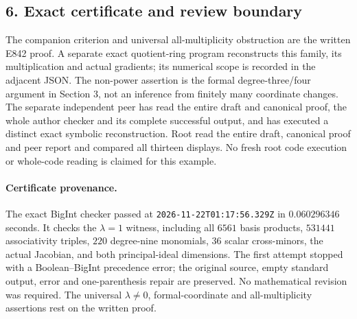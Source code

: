 \subsection{6. Exact certificate and review boundary}\label{SF-E844:exact-certificate-and-review-boundary}

The companion criterion and universal all-multiplicity obstruction are the
written E842 proof. A separate exact quotient-ring program reconstructs this
family, its multiplication and actual gradients; its numerical scope is
recorded in the adjacent JSON. The non-power assertion is the formal
degree-three/four argument in Section 3, not an inference from finitely many
coordinate changes. The separate independent peer has read the entire draft and canonical proof, the whole author checker and its complete successful output, and has executed a distinct exact symbolic reconstruction. Root read the entire draft, canonical proof and peer report and compared all thirteen displays. No fresh root code execution or whole-code reading is claimed for this example.

\paragraph{Certificate provenance.}
The exact BigInt checker passed at \texttt{2026-11-22T01:17:56.329Z} in \(0.060296346\) seconds. It checks the \(\lambda=1\) witness, including all \(6561\) basis products, \(531441\) associativity triples, \(220\) degree-nine monomials, \(36\) scalar cross-minors, the actual Jacobian, and both principal-ideal dimensions. The first attempt stopped with a Boolean--BigInt precedence error; the original source, empty standard output, error and one-parenthesis repair are preserved. No mathematical revision was required. The universal \(\lambda\ne0\), formal-coordinate and all-multiplicity assertions rest on the written proof.
